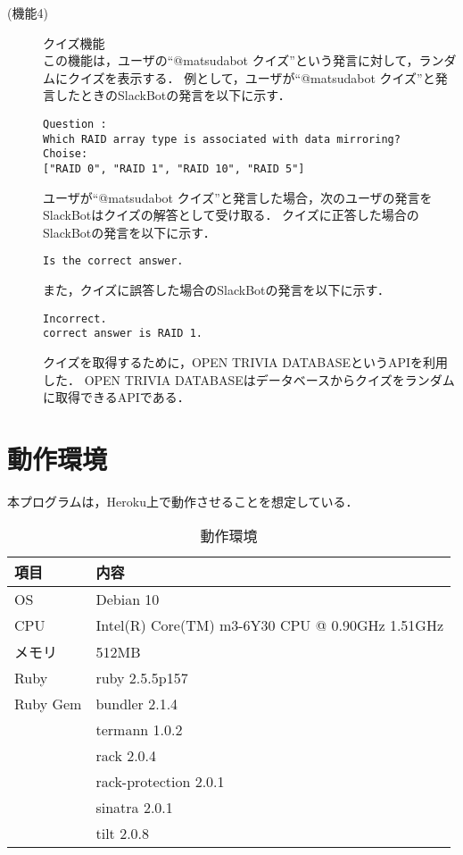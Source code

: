 \documentclass[12pt]{jsarticle}
\begin{document}
\begin{description}
\item[(機能4)] クイズ機能\\
この機能は，ユーザの``@matsudabot クイズ''という発言に対して，ランダムにクイズを表示する．
例として，ユーザが``@matsudabot クイズ''と発言したときのSlackBotの発言を以下に示す．
\begin{verbatim}
Question :
Which RAID array type is associated with data mirroring?
Choise:
["RAID 0", "RAID 1", "RAID 10", "RAID 5"]
\end{verbatim}
ユーザが``@matsudabot クイズ''と発言した場合，次のユーザの発言をSlackBotはクイズの解答として受け取る．
クイズに正答した場合のSlackBotの発言を以下に示す．
\begin{verbatim}
Is the correct answer.
\end{verbatim}
また，クイズに誤答した場合のSlackBotの発言を以下に示す．
\begin{verbatim}
Incorrect.
correct answer is RAID 1.
\end{verbatim}
クイズを取得するために，OPEN TRIVIA DATABASE\cite{Open Trivia DB}というAPIを利用した．
OPEN TRIVIA DATABASEはデータベースからクイズをランダムに取得できるAPIである．
\end{description}

\section{動作環境}
本プログラムは，Heroku上で動作させることを想定している．
\begin{table}[h]
\begin{center}
\caption{動作環境}\label{tab:2}
\begin{tabular}{l|l}
\hline\hline
\multicolumn{1}{l|}{項目} & \multicolumn{1}{l}{内容}\\
\hline
OS & Debian 10\\
CPU & Intel(R) Core(TM) m3-6Y30 CPU @ 0.90GHz 1.51GHz\\
メモリ & 512MB\\
Ruby & ruby 2.5.5p157\\
Ruby Gem & bundler 2.1.4\\
& termann 1.0.2\\
& rack 2.0.4\\
& rack-protection 2.0.1\\
& sinatra 2.0.1\\ 
& tilt 2.0.8\\
\hline
\end{tabular}
\end{center}
\end{table}
\end{document}

